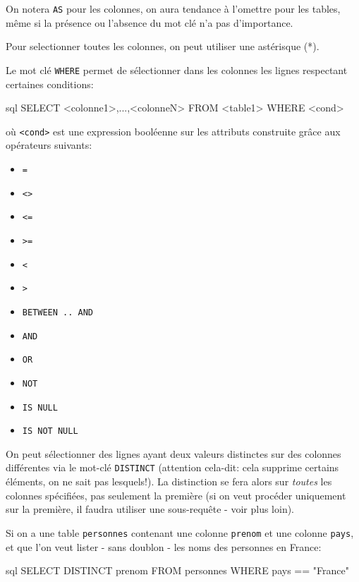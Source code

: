 \documentclass[a4paper]{scrartcl}
\begin{document}
				\rem On notera \texttt{AS} pour les colonnes, on aura tendance à l'omettre pour les tables, même si la présence ou l'absence du mot clé n'a pas d'importance.

				\rem Pour selectionner toutes les colonnes, on peut utiliser une astérisque (*).
				
				Le mot clé \texttt{WHERE} permet de sélectionner dans les colonnes les lignes respectant certaines conditions:
				\begin{code}{sql}
					SELECT <colonne1>,...,<colonneN>
					FROM <table1>
					WHERE <cond>
				\end{code}
				où \texttt{<cond>} est une expression booléenne sur les attributs construite grâce aux opérateurs suivants:
				\begin{multicols}{4}
				\begin{itemize}
					\item \texttt{=}
					\item \texttt{<>}
					\item \texttt{<=}
					\item \texttt{>=}
					\item \texttt{<}
					\item \texttt{>}
					\item \texttt{BETWEEN .. AND}
					\item \texttt{AND}
					\item \texttt{OR}
					\item \texttt{NOT}
					\item \texttt{IS NULL}
					\item \texttt{IS NOT NULL}
				\end{itemize}
				\end{multicols}

				On peut sélectionner des lignes ayant deux valeurs distinctes sur des colonnes différentes via le mot-clé \texttt{DISTINCT}
				(attention cela-dit: cela supprime certains éléments, on ne sait pas lesquels!). 
				La distinction se fera alors sur \textsl{toutes} les colonnes spécifiées, pas seulement la première (si on veut procéder uniquement sur la première, il faudra utiliser une sous-requête - voir plus loin).

				\exemple Si on a une table \texttt{personnes} contenant une colonne \texttt{prenom} et une colonne \texttt{pays}, 
				et que l'on veut lister - sans doublon - les noms des personnes en France:
				\begin{code}{sql}
					SELECT DISTINCT prenom
					FROM personnes
					WHERE pays == "France"
				\end{code}
\end{document}
